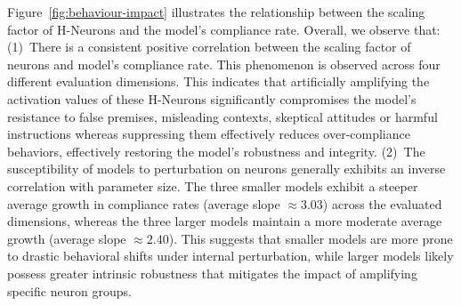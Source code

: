 \documentclass[dvipsnames]{article}
\begin{document}
Figure~\ref{fig:behaviour-impact} illustrates the relationship between the scaling factor of H-Neurons and the model's compliance rate. %
Overall, we observe that: (1)~There is a consistent positive correlation between the scaling factor of neurons and model's compliance rate. This phenomenon is observed across four different evaluation dimensions. This indicates that artificially amplifying the activation values of these H-Neurons significantly compromises the model's resistance to false premises, misleading contexts, skeptical attitudes or harmful instructions whereas suppressing them effectively reduces over-compliance behaviors, effectively restoring the model's robustness and integrity.
(2)~The susceptibility of models to perturbation on neurons generally exhibits an inverse correlation with parameter size. The three smaller models exhibit a steeper average growth in compliance rates (average slope $\approx 3.03$) across the evaluated dimensions, whereas the three larger models maintain a more moderate average growth (average slope $\approx 2.40$). This suggests that smaller models are more prone to drastic behavioral shifts under internal perturbation, while larger models likely possess greater intrinsic robustness that mitigates the impact of amplifying specific neuron groups.
\end{document}
